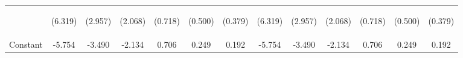 \documentclass[]{article}
\begin{document}
\begin{center}
\begin{tabular}{lcccccccccccc}
\vspace{4pt} & \begin{footnotesize}(6.319)\end{footnotesize} & \begin{footnotesize}(2.957)\end{footnotesize} & \begin{footnotesize}(2.068)\end{footnotesize} & \begin{footnotesize}(0.718)\end{footnotesize} & \begin{footnotesize}(0.500)\end{footnotesize} & \begin{footnotesize}(0.379)\end{footnotesize} & \begin{footnotesize}(6.319)\end{footnotesize} & \begin{footnotesize}(2.957)\end{footnotesize} & \begin{footnotesize}(2.068)\end{footnotesize} & \begin{footnotesize}(0.718)\end{footnotesize} & \begin{footnotesize}(0.500)\end{footnotesize} & \begin{footnotesize}(0.379)\end{footnotesize} \\
Constant & -5.754 & -3.490 & -2.134 & 0.706 & 0.249 & 0.192 & -5.754 & -3.490 & -2.134 & 0.706 & 0.249 & 0.192 \\

\end{tabular}
\end{center}
\end{document}
